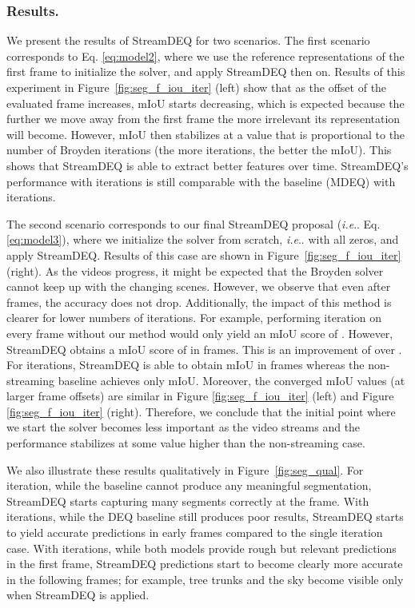 \documentclass[runningheads]{llncs}
\makeatletter
\DeclareRobustCommand\onedot{\futurelet\@let@token\@onedot}
\def\@onedot{\ifx\@let@token.\else.\null\fi\xspace}
\def\ie{\emph{i.e}\onedot} \def\Ie{\emph{I.e}\onedot}
\makeatother
\begin{document}
\subsubsection{Results.}


We present the results of StreamDEQ for two scenarios. The first scenario corresponds to Eq. \ref{eq:model2}, where we use the reference representations of the first frame to initialize the solver, and apply StreamDEQ then on. Results of this experiment in Figure~\ref{fig:seg_f_iou_iter} (left) show that as the offset of the evaluated frame increases, mIoU starts decreasing, which is expected because the further we move away from the first frame the more irrelevant its representation will become. However, mIoU then stabilizes at a value that is proportional to the number of Broyden iterations (the more iterations, the better the mIoU). This shows that StreamDEQ is able to extract better features over time. StreamDEQ’s performance with  iterations is still comparable with the baseline (MDEQ) with  iterations.


The second scenario corresponds to our final StreamDEQ proposal (\ie Eq. \ref{eq:model3}), where we initialize the solver from scratch, \ie with all zeros, and apply StreamDEQ. Results of this case are shown in Figure~\ref{fig:seg_f_iou_iter} (right). As the videos progress, it might be expected that the Broyden solver cannot keep up with the changing scenes. However, we observe that even after  frames, the accuracy does not drop. Additionally, the impact of this method is clearer for lower numbers of iterations. For example, performing  iteration on every frame without our method would only yield an mIoU score of . However, StreamDEQ obtains a mIoU score of  in  frames. This is an improvement of over . For  iterations, StreamDEQ is able to obtain  mIoU in  frames whereas the non-streaming baseline achieves  only  mIoU. Moreover, the converged mIoU values (at larger frame offsets) are similar in Figure \ref{fig:seg_f_iou_iter} (left) and Figure \ref{fig:seg_f_iou_iter} (right). Therefore, we conclude that the initial point where we start the solver becomes less important as the video streams and the performance stabilizes at some value higher than the non-streaming case.


We also illustrate these results qualitatively in Figure~\ref{fig:seg_qual}. For  iteration, while the baseline cannot produce any meaningful segmentation, StreamDEQ starts capturing many segments correctly at the  frame. With  iterations, while the DEQ baseline still produces poor results, StreamDEQ starts to yield accurate predictions in early frames compared to the single iteration case. With  iterations, while both models provide rough but relevant predictions in the first frame, StreamDEQ predictions start to become clearly more accurate in the following frames; for example, tree trunks and the sky become visible only when StreamDEQ is applied.
\end{document}
